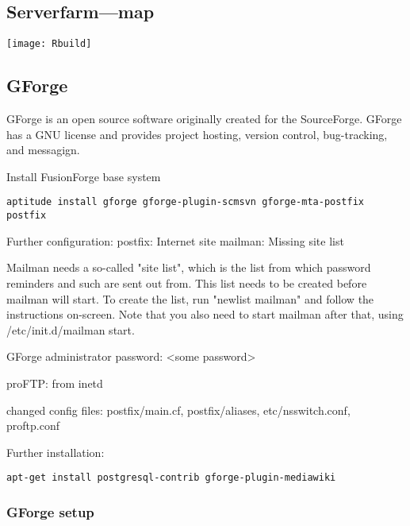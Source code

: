 \documentclass[a4paper]{article}
\begin{document}
\subsection{Serverfarm---map}

\texttt{[image: Rbuild]}

\subsection{GForge}

GForge is an open source software originally created for the
SourceForge. GForge has a GNU license and provides project hosting,
version control, bug-tracking, and messagign.

Install FusionForge base system

\begin{lstlisting}[frame=single, framerule=0.95pt]
aptitude install gforge gforge-plugin-scmsvn gforge-mta-postfix postfix
\end{lstlisting}

\par
Further configuration: 
postfix: Internet site 
mailman: Missing site list 

Mailman needs a so-called "site list", which is the list from
which password reminders and such are sent out from.  This list
needs to be created before mailman will start. To create
the list, run "newlist mailman" and follow the instructions on-screen.
Note that you also need to start mailman after that, using
/etc/init.d/mailman start.

GForge administrator password: \textless some password\textgreater


proFTP: from inetd

changed config files: postfix/main.cf, postfix/aliases, etc/nsswitch.conf, proftp.conf

Further installation: 

\begin{lstlisting}[frame=single, framerule=0.95pt]
apt-get install postgresql-contrib gforge-plugin-mediawiki
\end{lstlisting}


\subsubsection{GForge setup}
\end{document}
